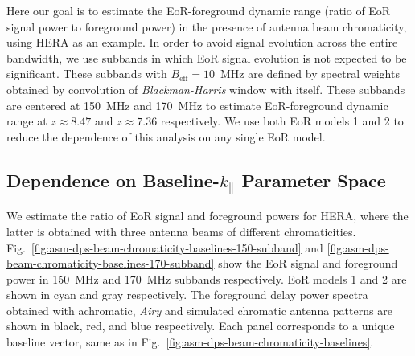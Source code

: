 \documentclass[preprint2,iop,numberedappendix,twocolappendix,appendixfloats]{emulateapj}
\begin{document}
Here our goal is to estimate the EoR-foreground dynamic range (ratio of EoR signal power to foreground power) in the presence of antenna beam chromaticity, using HERA as an example. %
In order to avoid signal evolution across the entire bandwidth, we use subbands in which EoR signal evolution is not expected to be significant. These subbands with $B_\textrm{eff}=10$~MHz are defined by spectral weights obtained by convolution of {\it Blackman-Harris} window with itself. These subbands are centered at 150~MHz and 170~MHz to estimate EoR-foreground dynamic range at $z \approx 8.47$ and $z \approx 7.36$ respectively. We use both EoR models 1 and 2 to reduce the dependence of this analysis on any single EoR model.

\subsection{Dependence on Baseline-$k_\parallel$ Parameter Space}\label{sec:baseline-kprll}

We estimate the ratio of EoR signal and foreground powers for HERA, where the latter is obtained with three antenna beams of different chromaticities. Fig.~\ref{fig:asm-dps-beam-chromaticity-baselines-150-subband} and \ref{fig:asm-dps-beam-chromaticity-baselines-170-subband} show the EoR signal and foreground power in 150~MHz and 170~MHz subbands respectively. EoR models 1 and 2 are shown in cyan and gray respectively. The foreground delay power spectra obtained with achromatic, {\it Airy} and simulated chromatic antenna patterns are shown in black, red, and blue respectively. Each panel corresponds to a unique baseline vector, same as in Fig.~\ref{fig:asm-dps-beam-chromaticity-baselines}. 
\end{document}
